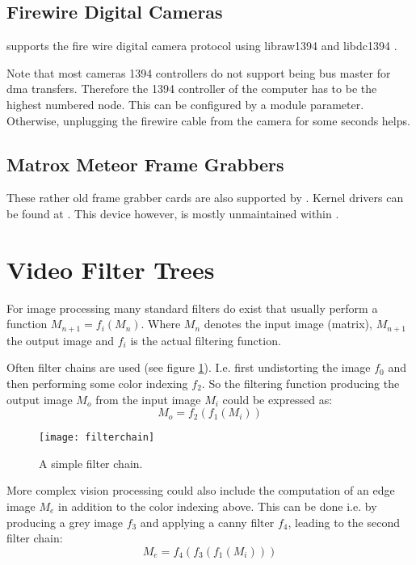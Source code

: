 \subsection{Firewire Digital Cameras}

\miro supports the fire wire digital camera protocol using
libraw1394\cite{} and libdc1394 \cite{}.
  
Note that most cameras 1394 controllers do not support being bus
master for dma transfers. Therefore the 1394 controller of the
computer has to be the highest numbered node. This can be configured
by a module parameter. Otherwise, unplugging the firewire cable from
the camera for some seconds helps.

\subsection{Matrox Meteor Frame Grabbers}

These rather old frame grabber cards are also supported by \miro.
Kernel drivers can be found at \cite{}. This device however, is mostly
unmaintained within \miro.

\section{Video Filter Trees}

For image processing many standard filters do exist that usually
perform a function $M_{n+1} = f_i(M_{n})$. Where $M_n$ denotes the input
image (matrix), $M_{n+1}$ the output image and $f_i$ is the actual
filtering function. 

Often filter chains are used (see figure \ref{fig:filterChain}). I.e.
first undistorting the image $f_0$ and then performing some color
indexing $f_2$. So the filtering function producing the output image
$M_o$ from the input image $M_i$ could be expressed as: $$M_o =
f_2(f_1(M_i))$$

\begin{figure}[!ht]
  \begin{center}
    \texttt{[image: filterchain]}
  \end{center}
\caption{A simple filter chain.}
\label{fig:filterChain}
\end{figure}

More complex vision processing could also include the computation of
an edge image $M_e$ in addition to the color indexing above. This can
be done i.e. by producing a grey image $f_3$ and applying a canny
filter $f_4$, leading to the second filter chain: 
$$M_e = f_4(f_3(f_1(M_i)))$$

